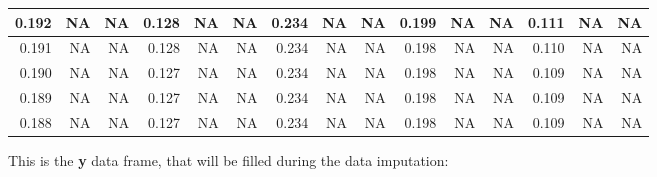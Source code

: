 \documentclass[
  table]{article}
\begin{document}
\begin{table}[H]
{\begin{tabular}[t]{r|r|r|r|r|r|r|r|r|r|r|r|r|r|r}
\hline
0.192 & NA & NA & 0.128 & NA & NA & 0.234 & NA & NA & 0.199 & NA & NA & 0.111 & NA & NA\\
\hline
0.191 & NA & NA & 0.128 & NA & NA & 0.234 & NA & NA & 0.198 & NA & NA & 0.110 & NA & NA\\
\hline
0.190 & NA & NA & 0.127 & NA & NA & 0.234 & NA & NA & 0.198 & NA & NA & 0.109 & NA & NA\\
\hline
0.189 & NA & NA & 0.127 & NA & NA & 0.234 & NA & NA & 0.198 & NA & NA & 0.109 & NA & NA\\
\hline
0.188 & NA & NA & 0.127 & NA & NA & 0.234 & NA & NA & 0.198 & NA & NA & 0.109 & NA & NA\\
\hline
\end{tabular}}
\end{table}

This is the \textbf{y} data frame, that will be filled during the data
imputation:
\end{document}
